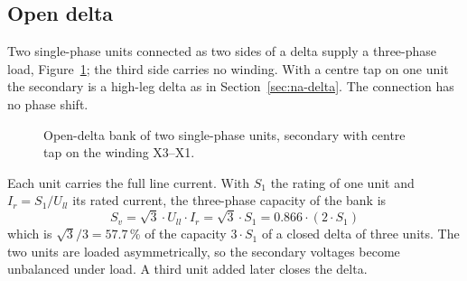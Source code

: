 \subsection{Open delta}
\label{sec:na-open}

Two single-phase units connected as two sides of a delta supply a
three-phase load, Figure~\ref{fig:na-open}; the third side carries no
winding. With a centre tap on one unit the secondary is a high-leg delta as
in Section~\ref{sec:na-delta}. The connection has no phase shift.

\begin{figure}[!ht]
  \centering
  
  \caption{Open-delta bank of two single-phase units, secondary with centre
  tap on the winding X3--X1.}
  \label{fig:na-open}
\end{figure}

Each unit carries the full line current. With $S_{1}$ the rating of one unit
and $I_{r} = S_{1} / U_{ll}$ its rated current, the three-phase capacity of
the bank is
\begin{equation}
  S_{v} = \sqrt{3} \cdot U_{ll} \cdot I_{r} = \sqrt{3} \cdot S_{1}
        = 0.866 \cdot (2 \cdot S_{1})
  \label{eq:na-open}
\end{equation}
which is $\sqrt{3}/3 = 57.7$\,\% of the capacity $3 \cdot S_{1}$ of a closed
delta of three units. The two units are loaded asymmetrically, so the
secondary voltages become unbalanced under load. A third unit added later
closes the delta.
\FloatBarrier
